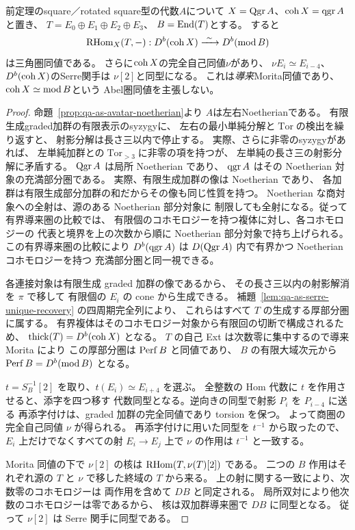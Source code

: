 \begin{proposition}[Noether性からcoherentな導来同値へ]
\label{prop:qa-as-avatar-coherent-morita}
前定理のsquare／rotated square型の代数$A$について
$X=\operatorname{Qgr} A$、$\operatorname{coh} X=\operatorname{qgr} A$と置き、
$T=E_0\oplus E_1\oplus E_2\oplus E_3$、
$B=\operatorname{End}(T)$とする。
すると
\[
 \operatorname{RHom}_X(T,-):
 D^b(\operatorname{coh} X)\xrightarrow{\ \sim\ }D^b(\mathrm{mod}\,B)
\]
は三角圏同値である。
さらに$\operatorname{coh} X$の完全自己同値$\nu$があり、
$\nu E_i\simeq E_{i-4}$、
$D^b(\operatorname{coh} X)$のSerre関手は
$\nu[2]$と同型になる。
これは\emph{導来}Morita同値であり、
$\operatorname{coh} X\simeq\mathrm{mod}\,B$という
Abel圏同値を主張しない。
\end{proposition}
\begin{proof}
命題~\ref{prop:qa-as-avatar-noetherian}より
$A$は左右Noetherianである。
有限生成graded加群の有限表示のsyzygyに、
左右の最小単純分解と$\operatorname{Tor}$の検出を繰り返すと、
射影分解は長さ三以内で停止する。
実際、さらに非零のsyzygyがあれば、
左単純加群との$\operatorname{Tor}_{>3}$に非零の項を持つが、
左単純の長さ三の射影分解に矛盾する。
$\operatorname{Qgr} A$ は局所 Noetherian であり、
$\operatorname{qgr} A$ はその Noetherian 対象の充満部分圏である。
実際、有限生成加群の像は Noetherian であり、
各加群は有限生成部分加群の和だからその像も同じ性質を持つ。
Noetherian な商対象への全射は、源のある Noetherian 部分対象に
制限しても全射になる。従って有界導来圏の比較では、
有限個のコホモロジーを持つ複体に対し、各コホモロジーの
代表と境界を上の次数から順に Noetherian 部分対象で持ち上げられる。
この有界導来圏の比較により $D^b(\operatorname{qgr} A)$ は
$D(\operatorname{Qgr} A)$ 内で有界かつ Noetherian コホモロジーを持つ
充満部分圏と同一視できる。

各連接対象は有限生成 graded 加群の像であるから、
その長さ三以内の射影解消を $\pi$ で移して
有限個の $E_i$ の cone から生成できる。
補題~\ref{lem:qa-as-serre-unique-recovery} の四周期完全列により、
これらはすべて $T$ の生成する厚部分圏に属する。
有界複体はそのコホモロジー対象から有限回の切断で構成されるため、
$\operatorname{thick}(T)=D^b(\operatorname{coh} X)$ となる。
$T$ の自己 Ext は次数零に集中するので導来 Morita により
この厚部分圏は $\operatorname{Perf} B$ と同値であり、
$B$ の有限大域次元から $\operatorname{Perf} B=D^b(\mathrm{mod}\,B)$ となる。

$t=S_B^{-1}[2]$ を取り、$t(E_i)\simeq E_{i+4}$ を選ぶ。
全整数の Hom 代数に $t$ を作用させると、添字を四つ移す
代数同型となる。逆向きの同型で射影 $P_i$ を $P_{i-4}$ に送る
再添字付けは、graded 加群の完全同値であり torsion を保つ。
よって商圏の完全自己同値 $\nu$ が得られる。
再添字付けに用いた同型を $t^{-1}$ から取ったので、
$E_i$ 上だけでなくすべての射 $E_i\to E_j$ 上で
$\nu$ の作用は $t^{-1}$ と一致する。

Morita 同値の下で $\nu[2]$ の核は
$\operatorname{RHom}(T,\nu(T)[2])$ である。
二つの $B$ 作用はそれぞれ源の $T$ と
$\nu$ で移した終域の $T$ から来る。
上の射に関する一致により、次数零のコホモロジーは
両作用を含めて $DB$ と同定される。
局所双対により他次数のコホモロジーは零であるから、
核は双加群導来圏で $DB$ に同型となる。
従って $\nu[2]$ は Serre 関手に同型である。
\end{proof}

